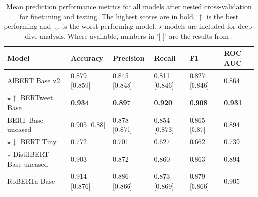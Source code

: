 \begin{table}[htbp]
    \centering
    \small %
    \begin{tabularx}{\textwidth}{|X|X|X|X|X|X|}
        \hline
        \rowcolor[gray]{0.7}
        \textbf{Model}                                  & \textbf{Accuracy} & \textbf{Precision} & \textbf{Recall} & \textbf{F1}    & \textbf{ROC AUC} \\
        \hline
        AlBERT Base v2                                  & 0.879 [0.859]     & 0.845 [0.848]      & 0.811 [0.846]   & 0.827 [0.846]  & 0.864            \\
        \rowcolor[gray]{0.9}
        \(\star\)\(\uparrow\) BERTweet Base             & \textbf{0.934}    & \textbf{0.897}     & \textbf{0.920}  & \textbf{0.908} & \textbf{0.931}   \\
        BERT Base uncased                               & 0.905 [0.88]      & 0.878  [0.871]     & 0.854  [0.873]  & 0.865 [0.87]   & 0.894            \\
        \rowcolor[gray]{0.9}
        \(\star\)\(\downarrow\) BERT Tiny & 0.772             & 0.701              & 0.627           & 0.662          & 0.739            \\
        \(\star\) DistilBERT Base uncased               & 0.903             & 0.872              & 0.860           & 0.863          & 0.894            \\
        \rowcolor[gray]{0.9}
        RoBERTa Base                                    & 0.914 [0.876]     & 0.886 [0.866]      & 0.873 [0.869]   & 0.879 [0.866]  & 0.905            \\
        \hline
    \end{tabularx}
    \caption{Mean prediction performance metrics for all models after nested cross-validation for finetuning and testing. The highest scores are in bold. \(\uparrow\) is the best performing and \(\downarrow\) is the worst performing model. \(\star\) models are included for deep-dive analysis. Where available, numbers in '[ ]' are the results from \cite{jin_complaint_2020}.}
    \label{tab: model_mean_metrics}
\end{table}


